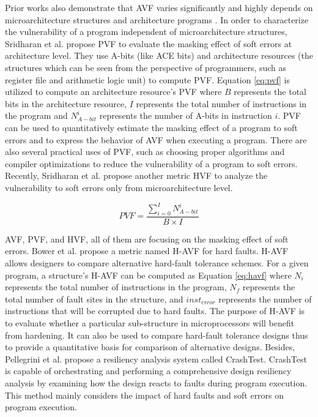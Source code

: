 Prior works also demonstrate that AVF varies significantly and highly depends on microarchitecture structures and architecture programs \cite{pan2009online}. In order to characterize the vulnerability of a program independent of microarchitecture structures, Sridharan et al. \cite{sridharan2009eliminating} propose PVF to evaluate the masking effect of soft errors at architecture level. They use A-bits (like ACE bits) and architecture resources (the structures which can be seen from the perspective of programmers, such as register file and arithmetic logic unit) to compute PVF. Equation \ref{eq:pvf} is utilized to compute an architecture resource’s PVF where $B$ represents the total bits in the architecture resource, $I$ represents the total number of instructions in the program and $N_{A-bit}^{i}$ represents the number of A-bits in instruction $i$. PVF can be used to quantitatively estimate the masking effect of a program to soft errors and to express the behavior of AVF when executing a program. There are also several practical uses of PVF, such as choosing proper algorithms and compiler optimizations to reduce the vulnerability of a program to soft errors. Recently, Sridharan et al. \cite{sridharan2010using} propose another metric HVF to analyze the vulnerability to soft errors only from microarchitecture level.

\begin{equation} \label{eq:pvf}
    PVF=\frac{\sum_{i=0}^{I}N_{A-bit}^{i}}{B \times I}
\end{equation}

AVF, PVF, and HVF, all of them are focusing on the masking effect of soft errors. Bower et al. \cite{bower2006applying} propose a metric named H-AVF for hard faults. H-AVF allows designers to compare alternative hard-fault tolerance schemes. For a given program, a structure’s H-AVF can be computed as Equation \ref{eq:havf} where $N_{i}$ represents the total number of instructions in the program, $N_{f}$ represents the total number of fault sites in the structure, and $inst_{error}$ represents the number of instructions that will be corrupted due to hard faults. The purpose of H-AVF is to evaluate whether a particular sub-structure in microprocessors will benefit from hardening. It can also be used to compare hard-fault tolerance designs thus to provide a quantitative basis for comparison of alternative designs. Besides, Pellegrini et al. \cite{pellegrini2008crashtest} propose a resiliency analysis system called CrashTest. CrashTest is capable of orchestrating and performing a comprehensive design resiliency analysis by examining how the design reacts to faults during program execution. This method mainly considers the impact of hard faults and soft errors on program execution.

